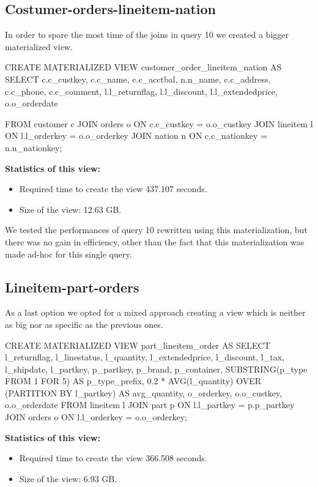 \subsection{Costumer-orders-lineitem-nation}
\label{ssec:costumer-orders-lineitem-nation}
In order to spare the most time of the joins in query 10 we created a bigger materialized view.
\begin{sql}
CREATE MATERIALIZED VIEW customer_order_lineitem_nation AS
SELECT
    c.c_custkey,
    c.c_name,
    c.c_acctbal,
    n.n_name,
    c.c_address,
    c.c_phone,
    c.c_comment,
    l.l_returnflag,
    l.l_discount,
    l.l_extendedprice,
    o.o_orderdate

FROM
    customer c
JOIN
    orders o ON c.c_custkey = o.o_custkey
JOIN
    lineitem l ON l.l_orderkey = o.o_orderkey
JOIN
    nation n ON c.c_nationkey = n.n_nationkey;
\end{sql}

\textbf{Statistics of this view:}
\begin{itemize}
    \item Required time to create the view 437.107 seconds.
    \item Size of the view: 12.63 GB.
\end{itemize}


We tested the performances of query 10 rewritten using this materialization, but there was no gain in efficiency, other than the fact that this materialization was made ad-hoc for this single query.

\subsection{Lineitem-part-orders}
As a last option we opted for a mixed approach creating a view which is neither as big nor as specific as the previous ones.

\begin{sql}
CREATE MATERIALIZED VIEW part_lineitem_order AS
SELECT
    l_returnflag,
    l_linestatus,
    l_quantity,
    l_extendedprice,
    l_discount,
    l_tax,
    l_shipdate,
    l_partkey,
    p_partkey,
    p_brand,
    p_container,
    SUBSTRING(p_type FROM 1 FOR 5) AS p_type_prefix,
    0.2 * AVG(l_quantity) OVER (PARTITION BY l_partkey) AS avg_quantity,
    o_orderkey,
    o.o_custkey,
    o.o_orderdate
FROM
    lineitem l
JOIN
    part p ON l.l_partkey = p.p_partkey
JOIN
    orders o ON l.l_orderkey = o.o_orderkey;
\end{sql}

\textbf{Statistics of this view:}
\begin{itemize}
    \item Required time to create the view 366.508 seconds.
    \item Size of the view: 6.93 GB.
\end{itemize}

